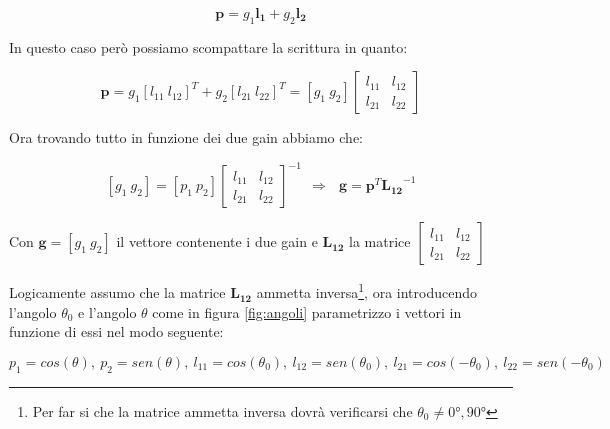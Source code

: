 \documentclass[12pt,a4paper]{report}
\begin{document}
\begin{equation}
\boldsymbol{p}= g_1 \boldsymbol{l_{1}} + g_2 \boldsymbol{l_{2}} %
\label{eq:bbbb}
\end{equation}

In questo caso però possiamo scompattare la scrittura in quanto:

\begin{equation}
\boldsymbol{p}=g_1 {\left[ l_{11} \ l_{12} \right]}^T + g_2 {\left[ l_{21} \ l_{22} \right]}^T= \left[ g_1 \ g_2 \right] \left[\begin{matrix}
l_{11} & l_{12}\\ l_{21} & l_{22}
\end{matrix} \right]
\label{eq:cccc}
\end{equation}

Ora trovando tutto in funzione dei due gain abbiamo che:

\begin{equation}
\left[g_1 \ g_2\right] = \left[ p_1 \ p_2 \right]  {\left[\begin{matrix}
l_{11} & l_{12}\\ l_{21} & l_{22}
\end{matrix} \right]}^{-1} \ \ \Rightarrow \ \ \ \boldsymbol{g}=\boldsymbol{p}^T {\boldsymbol{L_{12}}}^{-1}
\label{eq:dddd}
\end{equation}

Con $\boldsymbol{g}= \left[ g_1 \ g_2 \right]$ il vettore contenente i due gain e $\boldsymbol{L_{12}}$ la matrice $\left[\begin{matrix}
l_{11} & l_{12}\\ l_{21} & l_{22}
\end{matrix}\right]$ 

Logicamente assumo che la matrice $\boldsymbol{L_{12}}$ ammetta inversa\footnote{Per far si che la matrice ammetta inversa dovrà verificarsi che $\theta_0\neq 0°,90°$}, ora introducendo l'angolo $\theta_0$ e l'angolo $\theta$ come in figura \ref{fig:angoli} parametrizzo i vettori in funzione di essi nel modo seguente:

\[ p_1=cos(\theta),\ p_2=sen(\theta),\ l_{11}=cos(\theta_0),\ l_{12}=sen(\theta_0),\ l_{21}=cos(-\theta_0),\ l_{22}=sen(-\theta_0) \]
\end{document}

